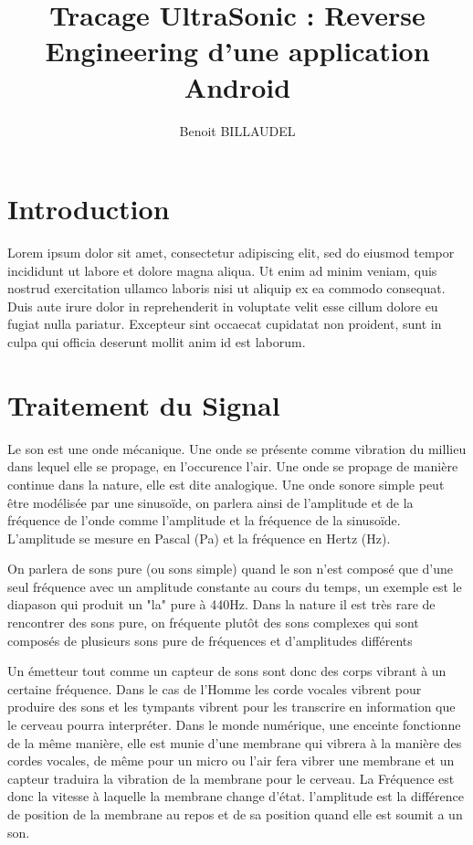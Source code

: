 \documentclass[12pt]{article}
\begin{document}
\title{Tracage UltraSonic : Reverse Engineering d'une application Android}
\author{Benoit BILLAUDEL}

\maketitle

\section*{Introduction}
Lorem ipsum dolor sit amet, consectetur adipiscing elit, sed do eiusmod tempor incididunt ut labore et dolore magna aliqua. Ut enim ad minim veniam, quis nostrud exercitation ullamco laboris nisi ut aliquip ex ea commodo consequat. Duis aute irure dolor in reprehenderit in voluptate velit esse cillum dolore eu fugiat nulla pariatur. Excepteur sint occaecat cupidatat non proident, sunt in culpa qui officia deserunt mollit anim id est laborum.

\section{Traitement du Signal}
Le son est une onde mécanique. Une onde se présente comme vibration du millieu dans lequel elle se propage, en l'occurence l'air.
Une onde se propage de manière continue dans la nature, elle est dite analogique. Une onde sonore simple peut être modélisée par une sinusoïde, on parlera ainsi de l'amplitude et de la fréquence de l'onde comme l'amplitude et la fréquence de la sinusoïde. L'amplitude se mesure en Pascal (Pa) et la fréquence en Hertz (Hz).

On parlera de sons pure (ou sons simple) quand le son n'est composé que d'une seul fréquence avec un amplitude constante au cours du temps, un exemple est le diapason qui produit un "la" pure à 440Hz.
Dans la nature il est très rare de rencontrer des sons pure, on fréquente plutôt des sons complexes qui sont composés de plusieurs sons pure de fréquences et d'amplitudes différents

Un émetteur tout comme un capteur de sons sont donc des corps vibrant à un certaine fréquence. Dans le cas de l'Homme les corde vocales vibrent pour produire des sons et les tympants vibrent pour les transcrire en information que le cerveau pourra interpréter. Dans le monde numérique, une enceinte fonctionne de la même manière, elle est munie d'une membrane qui vibrera à la manière des cordes vocales, de même pour un micro ou l'air fera vibrer une membrane et un capteur traduira la vibration de la membrane pour le cerveau. La Fréquence est donc la vitesse à laquelle la membrane change d'état. l'amplitude est la différence de position de la membrane au repos et de sa position quand elle est soumit a un son.
\end{document}

